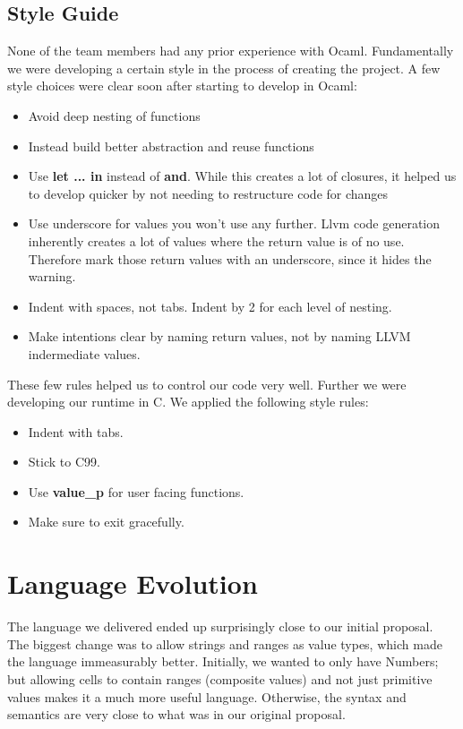 \subsection{Style Guide}
  None of the team members had any prior experience with Ocaml. Fundamentally we were developing a certain style in the process of creating the project. A few style choices were clear soon after starting to develop in Ocaml:
  \begin{itemize}
  \item Avoid deep nesting of functions
  \item Instead build better abstraction and reuse functions
  \item Use \textbf{let ... in} instead of \textbf{and}. While this creates a lot of closures, it helped us to develop quicker by not needing to restructure code for changes
  \item Use underscore for values you won't use any further. Llvm code generation inherently creates a lot of values where the return value is of no use. Therefore mark those return values with an underscore, since it hides the warning.
  \item Indent with spaces, not tabs. Indent by 2 for each level of nesting.
  \item Make intentions clear by naming return values, not by naming LLVM indermediate values.
  \end{itemize}
These few rules helped us to control our code very well.\newline
Further we were developing our runtime in C. We applied the following style rules:
  \begin{itemize}
  \item Indent with tabs.
  \item Stick to C99.
  \item Use \textbf{value\_p} for user facing functions.
  \item Make sure to exit gracefully.
  \end{itemize}

\section{Language Evolution}
The language we delivered ended up surprisingly close to our initial proposal. The biggest change was to allow strings and ranges as value types, which made the language immeasurably better. Initially, we wanted to only have Numbers; but allowing cells to contain ranges (composite values) and not just primitive values makes it a much more useful language. Otherwise, the syntax and semantics are very close to what was in our original proposal.

